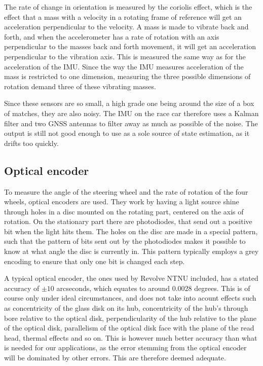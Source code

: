 The rate of change in orientation is measured by the coriolis effect, which is the effect that a mass with a velocity in a rotating frame of reference will get an acceleration perpendicular to the velocity. A mass is made to vibrate back and forth, and when the accelerometer has a rate of rotation  with an axis perpendicular to the masses back and forth movement, it will get an acceleration perpendicular to the vibration axis. This is measured the same way as for the acceleration of the IMU. Since the way the IMU measures acceleration of the mass is restricted to one dimension, measuring the three possible dimensions of rotation demand three of these vibrating masses. 

Since these sensors are so small, a high grade one being around the size of a box of matches, they are also noisy. The IMU on the race car therefore uses a Kalman filter and two GNSS antennas to filter away as much as possible of the noise. The output is still not good enough to use as a sole source of state estimation, as it drifts too quickly.
\subsection{Optical encoder}

To measure the angle of the steering wheel and the rate of rotation of the four wheels, optical encoders are used. They work by having a light source shine through holes in a disc mounted on the rotating part, centered on the axis of rotation. On the stationary part there are photodiodes, that send out a positive bit when the light hits them. The holes on the disc are made in a special pattern, such that the pattern of bits sent out by the photodiodes makes it possible to know at what angle the disc is currently in. This pattern typically employs a grey encoding to ensure that only one bit is changed each step. 

A typical optical encoder, the ones used by Revolve NTNU included, has a stated accuracy of $\pm 10$ arcseconds, which equates to around $0.0028$ degrees. This is of course only under ideal circumstances, and does not take into acount effects such as concentricity of the glass disk on its hub, concentricity of the hub’s through bore relative to the optical disk, perpendicularity of the hub relative to the plane of the optical disk, parallelism of the optical disk face with the plane of the read head, thermal effects and so on. This is however much better accuracy than what is needed for our applications, as the error stemming from the optical encoder will be dominated by other errors. This are therefore deemed adequate.

